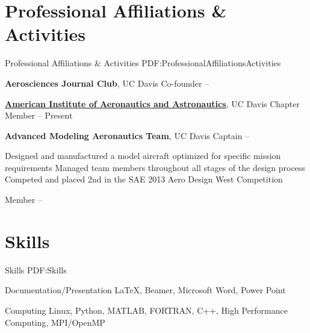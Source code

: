 \documentclass[letterpaper,MMMyyyy,nonstop]{simpleresumecv}
\begin{document}
\begin{body}

\section
{Professional Affiliations\newline
\& Activities}
{Professional Affiliations \& Activities}
{PDF:ProfessionalAffiliationsActivities}

\textbf{Aerosciences Journal Club},
UC Davis
\GapNoBreak
\BulletItem
Co-founder
\hfill
{} --


\href{https://www.aiaa.org/}
{\textbf{American Institute of Aeronautics and Astronautics}},
UC Davis Chapter
\GapNoBreak
\BulletItem
Member
\hfill
{} --
Present


\textbf{Advanced Modeling Aeronautics Team},
UC Davis
\GapNoBreak
\BulletItem
Captain
\hfill
{} --
\begin{detail}
\SubBulletItem
Designed and manufactured a model aircraft optimized for specific mission requirements
\SubBulletItem
Managed team members throughout all stages of the design process
\SubBulletItem
Competed and placed 2nd in the SAE 2013 Aero Design West Competition
\end{detail}
\GapNoBreak
\BulletItem
Member
\hfill
 --




\section
{Skills}
{Skills}
{PDF:Skills}

Documentation/Presentation
\BulletItem
{\LaTeX},
Beamer,
Microsoft Word, Power Point

\GapNoBreak
Computing
\BulletItem
Linux,
Python,
MATLAB,
FORTRAN,
C++,
High Performance Computing,
MPI/OpenMP


\end{body}
\end{document}
